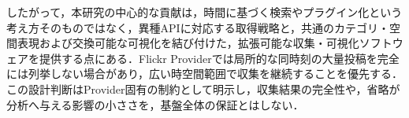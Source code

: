 したがって，本研究の中心的な貢献は，時間に基づく検索やプラグイン化という考え方そのものではなく，異種APIに対応する取得戦略と，共通のカテゴリ・空間表現および交換可能な可視化を結び付けた，拡張可能な収集・可視化ソフトウェアを提供する点にある．Flickr Providerでは局所的な同時刻の大量投稿を完全には列挙しない場合があり，広い時空間範囲で収集を継続することを優先する．この設計判断はProvider固有の制約として明示し，収集結果の完全性や，省略が分析へ与える影響の小ささを，基盤全体の保証とはしない．


